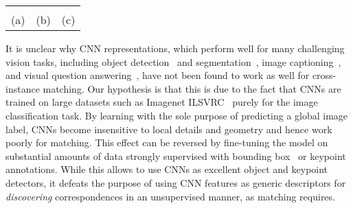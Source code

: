 \documentclass[10pt,twocolumn,letterpaper]{article}
\begin{document}
\begin{figure*}[t!]
\begin{center}
\begin{tabular}{ccc}
{		%
	 } \\
    {\normalsize(a)} & {\normalsize(b)} & {\normalsize(c)} \\ %
   \end{tabular}
   \vspace{-0.6cm}
  \end{center}
  \caption{Example responses of anchor filters discovered by the AnchorNet. (a), (b) show the class specific filters $F_k^{C_i}$ for bird and dog classes respectively while (c) depicts the class agnostic filters $F_k^{S}$ across different categories (one filter per row).} 
  \label{fig:learnedfilters}
  \vspace{-0.2cm}
\end{figure*}

It is unclear why CNN representations, which perform well for many challenging vision tasks, including object detection~\cite{girshick15fastrcnn} and segmentation~\cite{long15fcn}, image captioning~\cite{vinyals15show}, and visual question answering~\cite{antol15VQA}, have not been found to work as well for cross-instance matching. Our hypothesis is that this is due to the fact that CNNs are trained on large datasets such as Imagenet ILSVRC~\cite{deng09imagenet}  purely for the image classification task. By learning with the sole purpose of predicting a global image label, CNNs become insensitive to local details and geometry and hence work poorly for matching. This effect can be reversed by fine-tuning the model on substantial amounts of data strongly supervised with bounding box~\cite{girshick15fastrcnn} or keypoint \cite{choy16universal} annotations. While this allows to use CNNs as excellent object and keypoint detectors, it defeats the purpose of using CNN features as generic descriptors for \emph{discovering} correspondences in an unsupervised manner, as matching requires.
\end{document}

